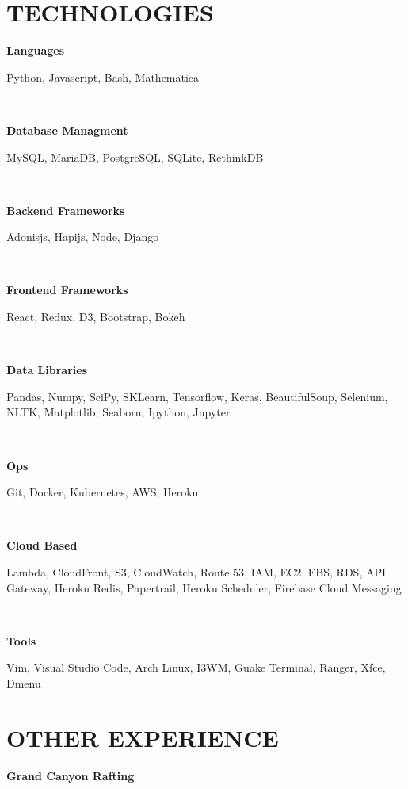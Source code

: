 \documentclass[12pt]{resume}
\begin{document}
    \hspace{10mm}
    \begin{minipage}[t]{0.48\textwidth}
        {\section* {TECHNOLOGIES}}
        { \par \bf Languages }
        { \par Python, Javascript, Bash, Mathematica}\\
        { \par \bf Database Managment }
        { \par MySQL, MariaDB, PostgreSQL, SQLite, RethinkDB}\\
        { \par \bf Backend Frameworks }
        { \par Adonisjs, Hapijs, Node, Django}\\
        { \par \bf Frontend Frameworks}
        { \par React, Redux, D3, Bootstrap, Bokeh}\\
        { \par \bf Data Libraries}
        { \par Pandas, Numpy, SciPy, SKLearn, Tensorflow, Keras, 
        BeautifulSoup, Selenium, NLTK, Matplotlib, Seaborn, Ipython, Jupyter}\\
        { \par \bf *Ops}
        { \par Git, Docker, Kubernetes, AWS, Heroku}\\
        { \par \bf Cloud Based}
        { \par Lambda, CloudFront, S3, CloudWatch, Route 53, IAM, EC2, EBS,
        RDS, API Gateway, Heroku Redis, Papertrail, Heroku Scheduler, Firebase
        Cloud Messaging}\\
        { \par \bf Tools }
        { \par Vim, Visual Studio Code, Arch Linux, I3WM, Guake Terminal, Ranger, Xfce,
        Dmenu}
        {\section* {OTHER EXPERIENCE}}
            {\par \bf Grand Canyon Rafting}
            \vspace{.05mm}
            \begin{itemize}

\end{itemize}
\end{minipage}
\end{document}
